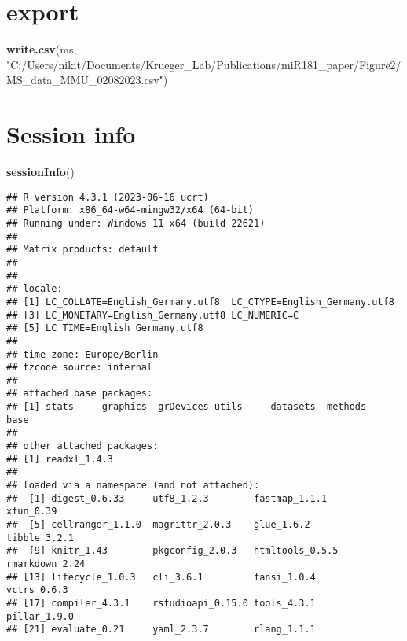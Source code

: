 \documentclass[
]{article}
\newenvironment{Shaded}{\begin{snugshade}}{\end{snugshade}}
\newcommand{\FunctionTok}[1]{\textcolor[rgb]{0.13,0.29,0.53}{\textbf{#1}}}
\newcommand{\NormalTok}[1]{#1}
\newcommand{\StringTok}[1]{\textcolor[rgb]{0.31,0.60,0.02}{#1}}
\begin{document}
\hypertarget{export}{%
\section{export}\label{export}}

\begin{Shaded}
\begin{Highlighting}[]
\FunctionTok{write.csv}\NormalTok{(ms, }\StringTok{"C:/Users/nikit/Documents/Krueger\_Lab/Publications/miR181\_paper/Figure2/MS\_data\_MMU\_02082023.csv"}\NormalTok{)}
\end{Highlighting}
\end{Shaded}

\hypertarget{session-info}{%
\section{Session info}\label{session-info}}

\begin{Shaded}
\begin{Highlighting}[]
\FunctionTok{sessionInfo}\NormalTok{()}
\end{Highlighting}
\end{Shaded}

\begin{verbatim}
## R version 4.3.1 (2023-06-16 ucrt)
## Platform: x86_64-w64-mingw32/x64 (64-bit)
## Running under: Windows 11 x64 (build 22621)
## 
## Matrix products: default
## 
## 
## locale:
## [1] LC_COLLATE=English_Germany.utf8  LC_CTYPE=English_Germany.utf8   
## [3] LC_MONETARY=English_Germany.utf8 LC_NUMERIC=C                    
## [5] LC_TIME=English_Germany.utf8    
## 
## time zone: Europe/Berlin
## tzcode source: internal
## 
## attached base packages:
## [1] stats     graphics  grDevices utils     datasets  methods   base     
## 
## other attached packages:
## [1] readxl_1.4.3
## 
## loaded via a namespace (and not attached):
##  [1] digest_0.6.33     utf8_1.2.3        fastmap_1.1.1     xfun_0.39        
##  [5] cellranger_1.1.0  magrittr_2.0.3    glue_1.6.2        tibble_3.2.1     
##  [9] knitr_1.43        pkgconfig_2.0.3   htmltools_0.5.5   rmarkdown_2.24   
## [13] lifecycle_1.0.3   cli_3.6.1         fansi_1.0.4       vctrs_0.6.3      
## [17] compiler_4.3.1    rstudioapi_0.15.0 tools_4.3.1       pillar_1.9.0     
## [21] evaluate_0.21     yaml_2.3.7        rlang_1.1.1
\end{verbatim}
\end{document}

